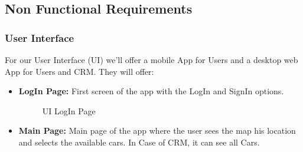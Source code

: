 \documentclass[a4paper]{article}
\begin{document}
\subsection{Non Functional Requirements}
\subsubsection{User Interface}
For our User Interface (UI) we'll offer a mobile App for Users and a desktop web App for Users and CRM. They will offer:
\begin {itemize}
\item \textbf{LogIn Page:} First screen of the app with the LogIn and SignIn options.
\begin{figure}[h]
\centering
\vspace*{\fill}
\noindent{}%
\caption {UI LogIn Page}
\vspace*{0.2cm}
\end{figure}
\pagebreak
\item \textbf{Main Page:} Main page of the app where the user sees the map his location and selects the available cars. In Case of CRM, it can see all Cars.
\begin{figure}[h]
\centering
\vspace*{\fill}
\noindent{}%

\end{figure}
\end{itemize}
\end{document}
